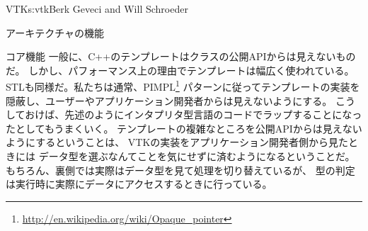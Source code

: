 \begin{aosachapter}{VTK}{s:vtk}{Berk Geveci and Will Schroeder}
\begin{aosasect1}{アーキテクチャの機能}
\begin{aosasect2}{コア機能}
一般に、C++のテンプレートはクラスの公開APIからは見えないものだ。
しかし、パフォーマンス上の理由でテンプレートは幅広く使われている。
STLも同様だ。私たちは通常、PIMPL\footnote{\url{http://en.wikipedia.org/wiki/Opaque\_pointer}}
パターンに従ってテンプレートの実装を隠蔽し、ユーザーやアプリケーション開発者からは見えないようにする。
こうしておけば、先述のようにインタプリタ型言語のコードでラップすることになったとしてもうまくいく。
テンプレートの複雑なところを公開APIからは見えないようにするということは、
VTKの実装をアプリケーション開発者側から見たときには
データ型を選ぶなんてことを気にせずに済むようになるということだ。
もちろん、裏側では実際はデータ型を見て処理を切り替えているが、
型の判定は実行時に実際にデータにアクセスするときに行っている。


\end{aosasect2}
\end{aosasect1}
\end{aosachapter}
